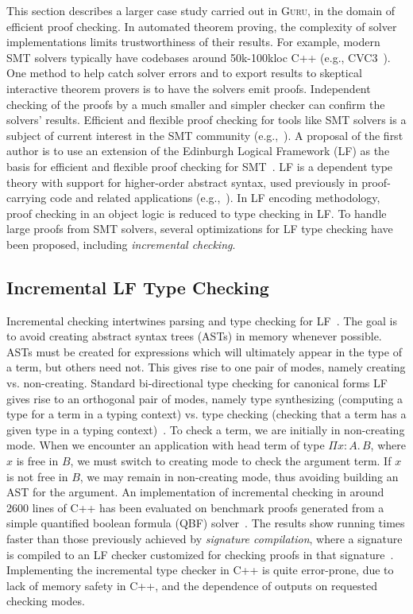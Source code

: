 \documentclass[preprint,natbib]{sigplanconf}
\newcommand{\guru}[0]{\textsc{Guru}}
\begin{document}
This section describes a larger case study carried out in \guru, in
the domain of efficient proof checking.  In automated theorem proving,
the complexity of solver implementations limits trustworthiness of
their results.  For example, modern SMT solvers typically have
codebases around 50k-100kloc C++ (e.g., \textsc{CVC3}~\cite{BT07}).
One method to help catch solver errors and to export results to
skeptical interactive theorem provers is to have the solvers emit
proofs.  Independent checking of the proofs by a much smaller and
simpler checker can confirm the solvers' results.  Efficient and
flexible proof checking for tools like SMT solvers is a subject of
current interest in the SMT community (e.g.,~\cite{moskal08}).  A
proposal of the first author is to use an extension of the Edinburgh
Logical Framework (LF) as the basis for efficient and flexible proof
checking for SMT~\cite{SO08,HHP93}.  LF is a dependent type theory
with support for higher-order abstract syntax, used previously in
proof-carrying code and related applications (e.g.,~\cite{A01,N97}).
In LF encoding methodology, proof checking in an object logic is
reduced to type checking in LF.  To handle large proofs from SMT
solvers, several optimizations for LF type checking have been
proposed, including \emph{incremental checking}.

\subsection{Incremental LF Type Checking}

Incremental checking intertwines parsing and type checking for
LF~\cite{stump08b}.  The goal is to avoid creating abstract syntax
trees (ASTs) in memory whenever possible.  ASTs must be created for
expressions which will ultimately appear in the type of a term, but
others need not.  This gives rise to one pair of modes, namely
creating vs. non-creating.  Standard bi-directional type checking for
canonical forms LF gives rise to an orthogonal pair of modes, namely
type synthesizing (computing a type for a term in a typing context)
vs. type checking (checking that a term has a given type in a typing
context)~\cite{clf02,pierce98local}.  To check a term, we are
initially in non-creating mode.  When we encounter an application with
head term of type $\Pi x : A.\, B$, where $x$ is free in $B$, we must
switch to creating mode to check the argument term.  If $x$ is not
free in $B$, we may remain in non-creating mode, thus avoiding
building an AST for the argument.  An implementation of incremental
checking in around 2600 lines of C++ has been evaluated on benchmark
proofs generated from a simple quantified boolean formula (QBF)
solver~\cite{stump08b}.  The results show running times faster than
those previously achieved by \emph{signature compilation}, where a
signature is compiled to an LF checker customized for checking proofs
in that signature~\cite{zeller07}.  Implementing the incremental type
checker in C++ is quite error-prone, due to lack of memory safety in
C++, and the dependence of outputs on requested checking modes.
\end{document}
